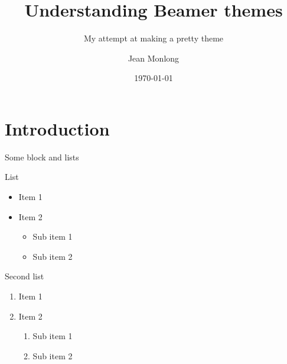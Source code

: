 \documentclass{beamer}
\title{Understanding Beamer themes}
\subtitle{My attempt at making a pretty theme}
\author{Jean Monlong}
\institute{Computational Genomics Lab\\UCSC Genomics Institute}
\date{\today}
\begin{document}
\begin{frame}
  \titlepage
\end{frame}

\section{Introduction}

\begin{frame}{Some block and lists}
  \begin{block}{List}
    \begin{itemize}
    \item Item 1
    \item Item 2
      \begin{itemize}
      \item Sub item 1
      \item Sub item 2
      \end{itemize}
    \end{itemize}
  \end{block}

  \begin{block}{Second list}
    \begin{enumerate}
    \item Item 1
    \item Item 2
      \begin{enumerate}
      \item Sub item 1
      \item Sub item 2
      \end{enumerate}
    \end{enumerate}
  \end{block}
  
\end{frame}
\end{document}
